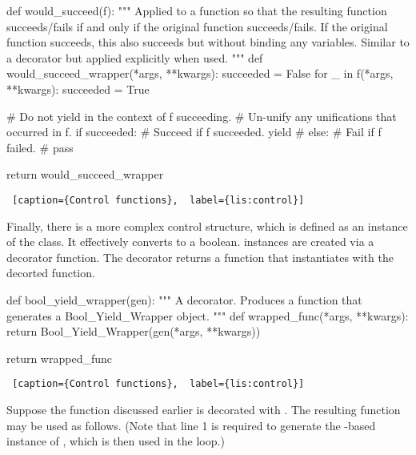 \begin{minipage}{\linewidth}  \largev \hrulefill
\begin{python}[numbers=left]
def would_succeed(f):
  """
  Applied to a function so that the resulting function succeeds/fails if and only if 
  the original function succeeds/fails.
  If the original function succeeds, this also succeeds but without binding any variables.
  Similar to a decorator but applied explicitly when used.
  """
  def would_succeed_wrapper(*args, **kwargs):
    succeeded = False
    for _ in f(*args, **kwargs):
      succeeded = True
      
    # Do not yield in the context of f succeeding.
    # Un-unify any unifications that occurred in f.
    if succeeded:
      # Succeed if f succeeded.
      yield  
    # else:
    #   Fail if f failed.
    #   pass   

  return would_succeed_wrapper

\end{python}
\begin{lstlisting} [caption={Control functions},  label={lis:control}]
\end{lstlisting}
\end{minipage}


Finally, there is a more complex control structure, which is defined as an instance of the  class. It effectively converts  to a boolean.  instances are created via a  decorator function. The decorator returns a function that instantiates  with the decorted function.

\begin{minipage}{\linewidth}  \largev \hrulefill
\begin{python}[numbers=left]
def bool_yield_wrapper(gen):
  """
  A decorator. Produces a function that generates a Bool_Yield_Wrapper object. 
  """
  def wrapped_func(*args, **kwargs):
    return Bool_Yield_Wrapper(gen(*args, **kwargs))

  return wrapped_func
\end{python}
\begin{lstlisting} [caption={Control functions},  label={lis:control}]
\end{lstlisting}
\end{minipage}

Suppose the  function discussed earlier is decorated with . The resulting function may be used as follows. (Note that line 1 is required to generate the -based instance of , which is then used in the  loop.)

